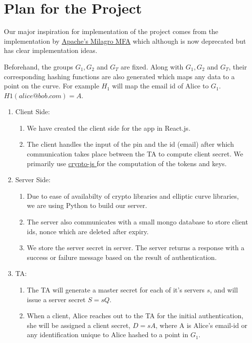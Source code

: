 \documentclass[]{article}   %
\begin{document}
\begin{itemize}
\end{itemize}

\section*{Plan for the Project}
Our major inspiration for implementation of the project comes from the implementation by \href{https://web.archive.org/web/20161107110119/http://docs.milagro.io/en/mfa/getting-started/milagro-mfa-developer-guide.html}{Apache's Milagro MFA} which although is now deprecated but has clear implementation ideas.

Beforehand, the groups $G_1, G_2$ and $G_T$ are fixed. Along with $G_1, G_2$ and $G_T$, their corresponding hashing functions are also generated which maps any data to a point on the curve. For example $H_1$ will map the email id of Alice to $G_1$. $H1(alice@bob.com) = A$.

\begin{enumerate}
    \item Client Side:
        \begin{enumerate}
            \item We have created the client side for the app in React.js.
            \item The client handles the input of the pin and the id (email) after which communication takes place between the TA to compute client secret. We primarily use \href{https://www.npmjs.com/package/crypto-js}{ crypto-js } for the computation of the tokens and keys.
        \end{enumerate}
    \item Server Side:
    \begin{enumerate}
        \item Due to ease of availabilty of crypto libraries and elliptic curve libraries, we are using Python to build our server.
        \item The server also communicates with a small mongo database to store client ids, nonce which are deleted after expiry. 
        \item We store the server secret in server. The server returns a response with a success or failure message based on the result of authentication. 
    \end{enumerate}
    \item TA:
    \begin{enumerate}
        \item The TA will generate a master secret for each of it's servers $s$, and will issue a server secret $S = sQ$.

        \item When a client, Alice reaches out to the TA for the initial authentication, she will be assigned a client secret, $D = sA$, where A is Alice's email-id or any identification unique to Alice hashed to a point in $G_1$.
    \end{enumerate}
\end{enumerate}
\newpage
\end{document}
